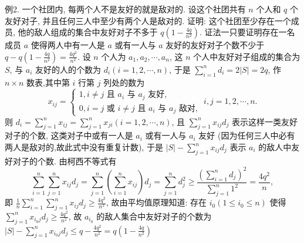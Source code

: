 例2. 一个社团内, 每两个人不是友好的就是敌对的.
设这个社团共有 $n$ 个人和 $q$ 个友好对子, 并且任何三人中至少有两个人是敌对的.
证明: 这个社团至少存在一个成员, 他的敌人组成的集合中友好对子不多于 $q\left(1-\frac{4 q}{n^2}\right)$. 
证法一只要证明存在一名成员 $a$ 使得两人中有一人是 $a$ 或有一人与 $a$ 友好的友好对子个数不少于 $q-q\left(1-\frac{4 q}{n^2}\right)=\frac{4 q^2}{n^2}$.
设 $n$ 个人为 $a_1, a_2, \cdots, a_n$, 这 $n$ 个人中友好对子组成的集合为 $S$, 与 $a_i$ 友好的人的个数为 $d_i(i=1,2, \cdots, n)$, 于是 $\sum_{i=1}^n d_i=2|S|=2 q$, 作 $n \times n$ 数表,其中第 $i$ 行第 $j$ 列处的数为
$$
x_{i j}=\left\{\begin{array}{l}
1, i \neq j \text { 且 } a_i \text { 与 } a_j \text { 友好, } \\
0, i=j \text { 或 } i \neq j \text { 且 } a_i \text { 与 } a_j \text { 敌对, }
\end{array} i, j=1,2, \cdots, n .\right.
$$
则 $d_i=\sum_{j=1}^n x_{i j}=\sum_{j=1}^n x_{j i}(i=1,2, \cdots, n)$, 且 $\sum_{j=1}^n x_{i j} d_j$ 表示这样一类友好对子的个数, 这类对子中或有一人是 $a_i$ 或有一人与 $a_i$ 友好 (因为任何三人中必有两人是敌对的,故此式中没有重复计数), 于是 $|S|-\sum_{j=1}^n x_{i j} d_j$ 表示 $a_i$ 的敌人中友好对子的个数.
由柯西不等式有
$$
\sum_{i=1}^n \sum_{j=1}^n x_{i j} d_j=\sum_{j=1}^n\left(\sum_{i=1}^n x_{i j}\right) d_j=\sum_{j=1}^n d_j^2 \geqslant \frac{\left(\sum_{i=1}^n d_j\right)^2}{\sum_{j=1}^n 1^2}=\frac{4 q^2}{n},
$$
即 $\frac{1}{n} \sum_{i=1}^n \sum_{j=1}^n x_{i j} d_j \geqslant \frac{4 q^2}{n^2}$, 故由平均值原理知道: 存在 $i_0\left(1 \leqslant i_0 \leqslant n\right)$ 使得 $\sum_{j=1}^n x_{i_0 j} d_j \geqslant \frac{4 q^2}{n^2}$, 故 $a_{i_0}$ 的敌人集合中友好对子的个数为 $|S|-\sum_{j=1}^n x_{i_0 j} d_j \leqslant q-\frac{4 q^2}{n^2}=q\left(1-\frac{4 q}{n^2}\right)$



